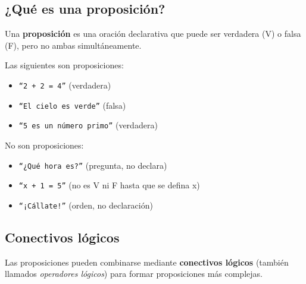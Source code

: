 
\subsection{¿Qué es una proposición?}

\begin{definicion}[Proposición]
Una \textbf{proposición} es una oración declarativa que puede ser verdadera (V)
o falsa (F), pero no ambas simultáneamente.
\end{definicion}

\begin{ejemplo}
Las siguientes son proposiciones:
\begin{itemize}
    \item \texttt{``2 + 2 = 4''}  (verdadera)
    \item \texttt{``El cielo es verde''}  (falsa)
    \item \texttt{``5 es un número primo''}  (verdadera)
\end{itemize}

No son proposiciones:
\begin{itemize}
    \item \texttt{``¿Qué hora es?''}  (pregunta, no declara)
    \item \texttt{``x + 1 = 5''}  (no es V ni F hasta que se defina x)
    \item \texttt{``¡Cállate!''}  (orden, no declaración)
\end{itemize}
\end{ejemplo}


\subsection{Conectivos lógicos}

Las proposiciones pueden combinarse mediante \textbf{conectivos lógicos}
(también llamados \textit{operadores lógicos}) para formar proposiciones
más complejas.


